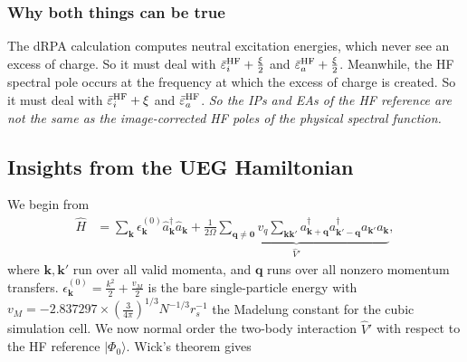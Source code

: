 \subsubsection{Why both things can be true}
The dRPA calculation computes neutral excitation energies, which never see an excess of charge. So it must deal with $\bar{\varepsilon}_i^{\rm HF}+\frac{\xi}{2}$ and $\bar{\varepsilon}_a^{\rm HF}+\frac{\xi}{2}$. Meanwhile, the HF spectral pole occurs at the frequency at which the excess of charge is created. So it must deal with $\bar{\varepsilon}_i^{\rm HF}+\xi$ and $\bar{\varepsilon}_a^{\rm HF}$.
\emph{So the IPs and EAs of the HF reference are not the same as the image-corrected HF poles of the physical spectral function.}
\subsection{Insights from the UEG Hamiltonian }
We begin from
\begin{align}
\hat H
&=
\sum_{\mathbf k}\epsilon_{\mathbf k}^{(0)}\hat a_{\mathbf k}^\dagger \hat a_{\mathbf k}
+
\underbrace{\frac{1}{2\Omega}
\sum_{\mathbf q\neq\mathbf 0}v_q
\sum_{\mathbf k\mathbf k'}
a_{\mathbf{k}+\mathbf q}^\dagger
a_{\mathbf{k}'-\mathbf q}^\dagger
a_{\mathbf k'}
a_{\mathbf k}}_{\hat V'},
\end{align}
where $\mathbf{k},\mathbf{k}'$ run over all valid momenta, and $\mathbf{q}$ runs over all nonzero momentum transfers. $\epsilon_{\mathbf k}^{(0)}=\frac{k^2}{2}+\frac{v_M}{2}$ is the bare single-particle energy with $v_M=-2.837297 \times\left(\frac{3}{4 \pi}\right)^{1 / 3} N^{-1 / 3} r_s^{-1}$ the Madelung constant for the cubic simulation cell. We now normal order the two-body interaction $\hat V'$ with respect to
the HF reference $|\Phi_0\rangle$. Wick's theorem gives
